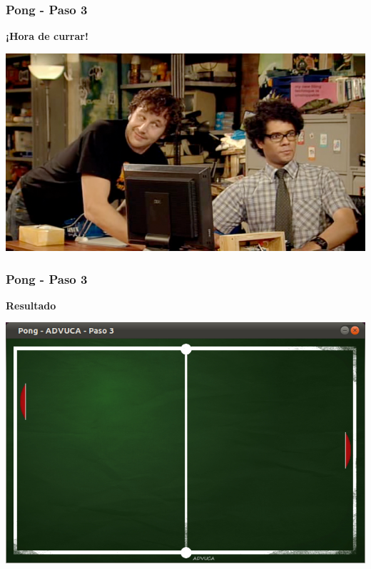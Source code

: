 \begin{frame}
	\frametitle{Pong - Paso 3}
	
    \begin{center}
        \textbf{¡Hora de currar!}
    \end{center}
	
    \begin{center}
		\includegraphics[scale=0.4]{img/currar-6.png}
	\end{center}	

\end{frame}

\begin{frame}
	\frametitle{Pong - Paso 3}
	
    \begin{center}
        \textbf{Resultado}
    \end{center}
	
    \begin{center}
		\includegraphics[scale=0.4]{img/pong-advuca-3.png}
	\end{center}	

\end{frame}

